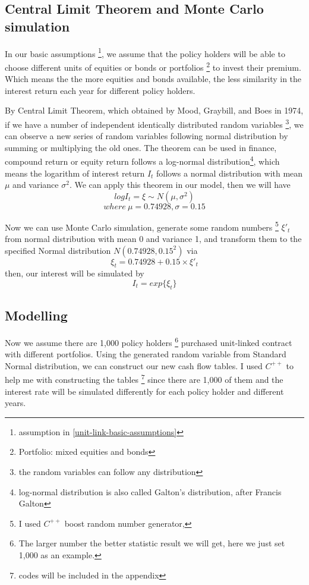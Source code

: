 \documentclass{report}
\begin{document}
\subsection{Central Limit Theorem and Monte Carlo simulation}

In our basic assumptions \footnote{assumption in \ref{unit-link-basic-assumptions}}, we assume that the policy holders will be able to choose different units of equities or bonds or portfolios \footnote{Portfolio: mixed equities and bonds} to invest their premium. Which means the the more equities and bonds available, the less similarity in the interest return each year for different policy holders. 

By \cite{bib:CLT}Central Limit Theorem, which obtained by Mood, Graybill, and Boes in 1974, if we have a number of independent identically distributed random variables \footnote{the random variables can follow any distribution}, we can observe a new series of random variables following normal distribution by summing or multiplying the old ones. The theorem can be used in finance, compound return or equity return follows a log-normal distribution\footnote{log-normal distribution is also called Galton's distribution, after Francis Galton}, which means the logarithm of interest return $I_t$ follows a normal distribution with mean $\mu$ and variance $\sigma^2$. We can apply this theorem in our model, then we will have
\[
logI_t = \xi \sim N(\mu,\sigma^2)
\]
\[
where\   \mu= 0.74928, \sigma= 0.15 
\]

Now we can use Monte Carlo simulation\cite{bib:MCS}, generate some random numbers \footnote{I used $C^{++}$ boost random number generator, } $\xi'_t$ from normal distribution with mean 0 and variance 1, and transform them to the specified Normal distribution $N(0.74928,0.15^2)$ via   
\[
\xi_t = 0.74928 + 0.15\times \xi'_t
\]
then, our interest will be simulated by 
\[
I_t=exp\{\xi_t\} 
\]



\subsection{Modelling}

Now we assume there are 1,000 policy holders \footnote{The larger number the better statistic result we will get, here we just set 1,000 as an example.} purchased unit-linked contract with different portfolios. Using the generated random variable from Standard Normal distribution, we can construct our new cash flow tables. I used $C^{++}$ to help me with constructing the tables \footnote{codes will be included in the appendix} since there are 1,000 of them and the interest rate will be simulated differently for each policy holder and different years.
\end{document}
